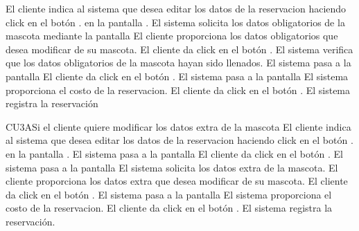 \begin{UCtrayectoria}
	\UCpaso[] El cliente indica al sistema que desea editar los datos de la reservacion haciendo click en el botón . en la pantalla .
	\UCpaso []El sistema solicita los datos obligatorios de la mascota mediante la pantalla 
	\UCpaso []El cliente proporciona los datos obligatorios que desea modificar de su mascota.
	\UCpaso []El cliente da click en el botón .
	\UCpaso []El sistema verifica que los datos obligatorios de la mascota hayan sido llenados.
	\UCpaso []El sistema pasa a la pantalla 
	\UCpaso []El cliente da click en el botón .
	\UCpaso []El sistema pasa a la pantalla 
	\UCpaso []El sistema proporciona el costo de la reservacion.
	\UCpaso []El cliente da click en el botón .
	\UCpaso []El sistema registra la reservación
\end{UCtrayectoria}


\begin{UCtrayectoriaA}{CU3}{A}{Si el cliente quiere modificar los datos extra de la mascota}
	\UCpaso[] El cliente indica al sistema que desea editar los datos de la reservacion haciendo click en el botón . en la pantalla .
	\UCpaso []El sistema pasa a la pantalla 
	\UCpaso []El cliente da click en el botón .
	\UCpaso []El sistema pasa a la pantalla 
	\UCpaso []El sistema solicita los datos extra de la mascota.
	\UCpaso []El cliente proporciona los datos extra que desea modificar de su mascota.
	\UCpaso []El cliente da click en el botón .
	\UCpaso []El sistema pasa a la pantalla 
	\UCpaso []El sistema proporciona el costo de la reservacion.
	\UCpaso []El cliente da click en el botón .
	\UCpaso []El sistema registra la reservación.
\end{UCtrayectoriaA}

